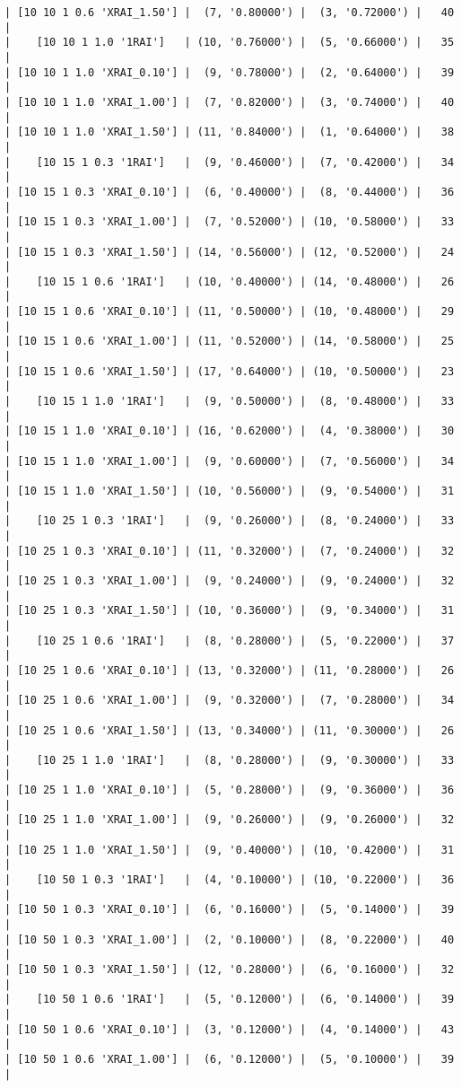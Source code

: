 \documentclass{article}
\begin{document}
\begin{verbatim}
| [10 10 1 0.6 'XRAI_1.50'] |  (7, '0.80000') |  (3, '0.72000') |   40  |
|    [10 10 1 1.0 '1RAI']   | (10, '0.76000') |  (5, '0.66000') |   35  |
| [10 10 1 1.0 'XRAI_0.10'] |  (9, '0.78000') |  (2, '0.64000') |   39  |
| [10 10 1 1.0 'XRAI_1.00'] |  (7, '0.82000') |  (3, '0.74000') |   40  |
| [10 10 1 1.0 'XRAI_1.50'] | (11, '0.84000') |  (1, '0.64000') |   38  |
|    [10 15 1 0.3 '1RAI']   |  (9, '0.46000') |  (7, '0.42000') |   34  |
| [10 15 1 0.3 'XRAI_0.10'] |  (6, '0.40000') |  (8, '0.44000') |   36  |
| [10 15 1 0.3 'XRAI_1.00'] |  (7, '0.52000') | (10, '0.58000') |   33  |
| [10 15 1 0.3 'XRAI_1.50'] | (14, '0.56000') | (12, '0.52000') |   24  |
|    [10 15 1 0.6 '1RAI']   | (10, '0.40000') | (14, '0.48000') |   26  |
| [10 15 1 0.6 'XRAI_0.10'] | (11, '0.50000') | (10, '0.48000') |   29  |
| [10 15 1 0.6 'XRAI_1.00'] | (11, '0.52000') | (14, '0.58000') |   25  |
| [10 15 1 0.6 'XRAI_1.50'] | (17, '0.64000') | (10, '0.50000') |   23  |
|    [10 15 1 1.0 '1RAI']   |  (9, '0.50000') |  (8, '0.48000') |   33  |
| [10 15 1 1.0 'XRAI_0.10'] | (16, '0.62000') |  (4, '0.38000') |   30  |
| [10 15 1 1.0 'XRAI_1.00'] |  (9, '0.60000') |  (7, '0.56000') |   34  |
| [10 15 1 1.0 'XRAI_1.50'] | (10, '0.56000') |  (9, '0.54000') |   31  |
|    [10 25 1 0.3 '1RAI']   |  (9, '0.26000') |  (8, '0.24000') |   33  |
| [10 25 1 0.3 'XRAI_0.10'] | (11, '0.32000') |  (7, '0.24000') |   32  |
| [10 25 1 0.3 'XRAI_1.00'] |  (9, '0.24000') |  (9, '0.24000') |   32  |
| [10 25 1 0.3 'XRAI_1.50'] | (10, '0.36000') |  (9, '0.34000') |   31  |
|    [10 25 1 0.6 '1RAI']   |  (8, '0.28000') |  (5, '0.22000') |   37  |
| [10 25 1 0.6 'XRAI_0.10'] | (13, '0.32000') | (11, '0.28000') |   26  |
| [10 25 1 0.6 'XRAI_1.00'] |  (9, '0.32000') |  (7, '0.28000') |   34  |
| [10 25 1 0.6 'XRAI_1.50'] | (13, '0.34000') | (11, '0.30000') |   26  |
|    [10 25 1 1.0 '1RAI']   |  (8, '0.28000') |  (9, '0.30000') |   33  |
| [10 25 1 1.0 'XRAI_0.10'] |  (5, '0.28000') |  (9, '0.36000') |   36  |
| [10 25 1 1.0 'XRAI_1.00'] |  (9, '0.26000') |  (9, '0.26000') |   32  |
| [10 25 1 1.0 'XRAI_1.50'] |  (9, '0.40000') | (10, '0.42000') |   31  |
|    [10 50 1 0.3 '1RAI']   |  (4, '0.10000') | (10, '0.22000') |   36  |
| [10 50 1 0.3 'XRAI_0.10'] |  (6, '0.16000') |  (5, '0.14000') |   39  |
| [10 50 1 0.3 'XRAI_1.00'] |  (2, '0.10000') |  (8, '0.22000') |   40  |
| [10 50 1 0.3 'XRAI_1.50'] | (12, '0.28000') |  (6, '0.16000') |   32  |
|    [10 50 1 0.6 '1RAI']   |  (5, '0.12000') |  (6, '0.14000') |   39  |
| [10 50 1 0.6 'XRAI_0.10'] |  (3, '0.12000') |  (4, '0.14000') |   43  |
| [10 50 1 0.6 'XRAI_1.00'] |  (6, '0.12000') |  (5, '0.10000') |   39  |

\end{verbatim}
\end{document}
